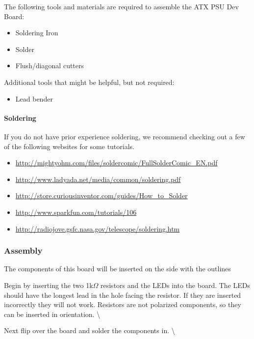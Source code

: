 The following tools and materials are required to assemble the ATX PSU
Dev Board:

\begin{itemize}
\item
  Soldering Iron
\item
  Solder
\item
  Flush/diagonal cutters
\end{itemize}

Additional tools that might be helpful, but not required:

\begin{itemize}
\item
  Lead bender
\end{itemize}

\paragraph{Soldering}

If you do not have prior experience soldering, we recommend checking out
a few of the following websites for some tutorials.

\begin{itemize}
\item
  \url{http://mightyohm.com/files/soldercomic/FullSolderComic_EN.pdf}
\item
  \url{http://www.ladyada.net/media/common/soldering.pdf}
\item
  \url{http://store.curiousinventor.com/guides/How_to_Solder}
\item
  \url{http://www.sparkfun.com/tutorials/106}
\item
  \url{http://radiojove.gsfc.nasa.gov/telescope/soldering.htm}
\end{itemize}

\subsubsection{Assembly}

The components of this board will be inserted on the side with the
outlines

Begin by inserting the two 1k$\Omega$ resistors and the LEDs into the
board. The LEDs should have the longest lead in the hole facing the
resistor. If they are inserted incorrectly they will not work. Resistors
are not polarized components, so they can be inserted in orientation.
\textbackslash{}

Next flip over the board and solder the components in. \textbackslash{}

